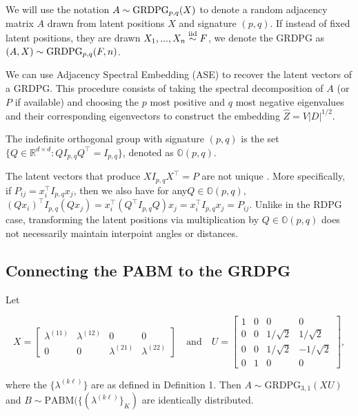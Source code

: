 \documentclass[12pt]{article}
\begin{document}
We will use the notation \(A \sim \mathrm{GRDPG}_{p,q}(X)\) to denote a random
adjacency matrix \(A\) drawn from latent positions \(X\) and signature
\((p, q)\). If instead of fixed latent positions, 
they are drawn $X_1, ..., X_n \stackrel{\mathrm{iid}}{\sim} F$, 
we denote the GRDPG as $(A, X) \sim \mathrm{GRDPG}_{p,q}(F, n)$.

\begin{remark}
We can use Adjacency Spectral Embedding (ASE) 
\cite{rubindelanchy2017statistical} to recover the latent vectors of a GRDPG. 
This procedure consists of taking the spectral decomposition of $A$ 
(or $P$ if available) and choosing the $p$ most positive and $q$ most negative
eigenvalues and their corresponding eigenvectors 
to construct the embedding $\hat{Z} = V |D|^{1/2}$. 
\end{remark}

\begin{definition}
The indefinite orthogonal group with signature $(p, q)$ is
the set $\{Q \in \mathbb{R}^{d \times d} : Q I_{p, q} Q^{\top} = I_{p, q}\}$,
denoted as $\mathbb{O}(p, q)$.
\end{definition}

\begin{remark}
The latent vectors that produce $X I_{p,q} X^\top = P$ are not unique
\cite{rubindelanchy2017statistical}.
More specifically, if $P_{ij} = x_i^\top I_{p, q} x_j$, 
then we also have for any$Q \in \mathbb{O}(p, q)$,
$(Q x_i)^\top I_{p, q} (Q x_j) = x_i^\top (Q^\top I_{p, q} Q) x_j =
x_i^\top I_{p, q} x_j = P_{ij}$.
Unlike in the RDPG case, transforming the latent positions via multiplication
by $Q \in \mathbb{O}(p, q)$ does not necessarily maintain interpoint angles or
distances.
\end{remark}

\hypertarget{connecting-the-pabm-to-the-grdpg}{%
\subsection{Connecting the PABM to the
GRDPG}\label{connecting-the-pabm-to-the-grdpg}}

\begin{proposition}[Connecting the PABM to the GRDPG for $K = 2$]
\label{theorem1}
Let

$$X = \begin{bmatrix}
\lambda^{(11)} & \lambda^{(12)} & 0 & 0 \\
0 & 0 & \lambda^{(21)} & \lambda^{(22)}
\end{bmatrix} \quad \text{and} \quad
U = \begin{bmatrix} 1 & 0 & 0 & 0 \\
0 & 0 & 1 / \sqrt{2} & 1 / \sqrt{2} \\
0 & 0 & 1 / \sqrt{2} & - 1 / \sqrt{2} \\
0 & 1 & 0 & 0 \end{bmatrix},$$

where the $\{\lambda^{(k \ell)}\}$ are as defined in Definition 1.
Then $A \sim \mathrm{GRDPG}_{3, 1}(X U)$ and 
$B \sim \mathrm{PABM}(\{(\lambda^{(k \ell)}\}_K)$ are
identically distributed.
\end{proposition}
\end{document}
